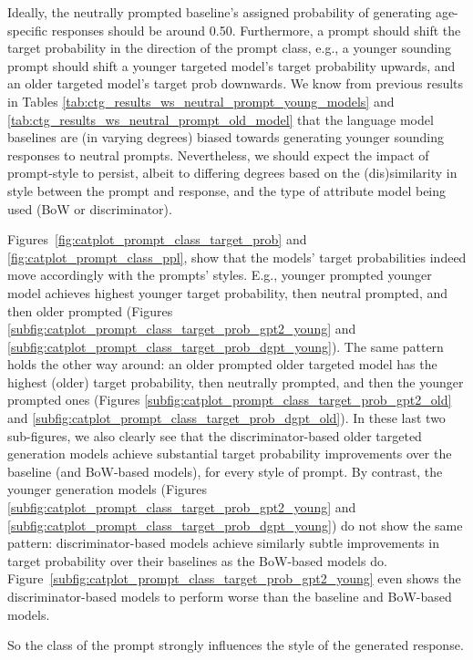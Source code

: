 Ideally, the neutrally prompted baseline's assigned probability of generating age-specific responses should be around 0.50. Furthermore, a prompt should shift the target probability in the direction of the prompt class, e.g., a younger sounding prompt should shift a younger targeted model's target probability upwards, and an older targeted model's target prob downwards. We know from previous results in Tables \ref{tab:ctg_results_ws_neutral_prompt_young_models} and \ref{tab:ctg_results_ws_neutral_prompt_old_model} that the language model baselines are (in varying degrees) biased towards generating younger sounding responses to neutral prompts. Nevertheless, we should expect the impact of prompt-style to persist, albeit to differing degrees based on the (dis)similarity in style between the prompt and response, and the type of attribute model being used (BoW or discriminator).


Figures~\ref{fig:catplot_prompt_class_target_prob} and \ref{fig:catplot_prompt_class_ppl}, show that the models' target probabilities indeed move accordingly with the prompts' styles. E.g., younger prompted younger model achieves highest younger target probability, then neutral prompted, and then older prompted (Figures \ref{subfig:catplot_prompt_class_target_prob_gpt2_young} and \ref{subfig:catplot_prompt_class_target_prob_dgpt_young}). The same pattern holds the other way around: an older prompted older targeted model has the highest (older) target probability, then neutrally prompted, and then the younger prompted ones (Figures \ref{subfig:catplot_prompt_class_target_prob_gpt2_old} and \ref{subfig:catplot_prompt_class_target_prob_dgpt_old}). In these last two sub-figures, we also clearly see that the discriminator-based older targeted generation models achieve substantial target probability improvements over the baseline (and BoW-based models), for every style of prompt. By contrast, the younger generation models (Figures \ref{subfig:catplot_prompt_class_target_prob_gpt2_young} and \ref{subfig:catplot_prompt_class_target_prob_dgpt_young}) do not show the same pattern: discriminator-based models achieve similarly subtle improvements in target probability over their baselines as the BoW-based models do. Figure~\ref{subfig:catplot_prompt_class_target_prob_gpt2_young} even shows the discriminator-based models to perform worse than the baseline and BoW-based models.

So the class of the prompt strongly influences the style of the generated response.

